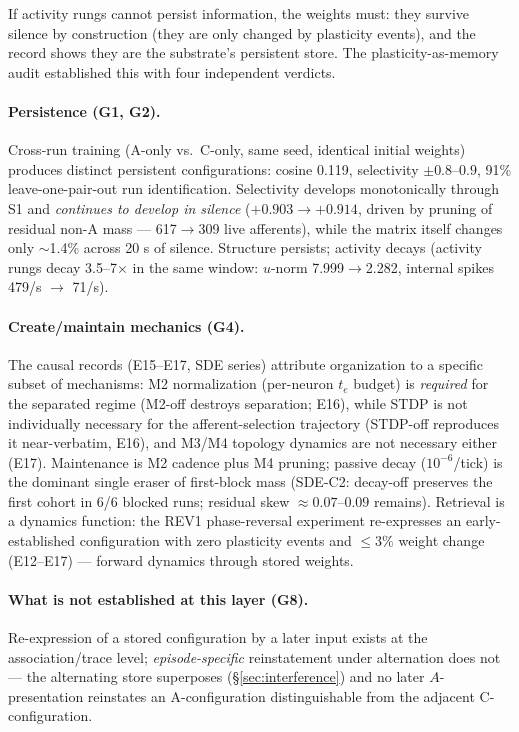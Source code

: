 If activity rungs cannot persist information, the weights must: they
survive silence by construction (they are only changed by plasticity
events), and the record shows they are the substrate's persistent store.
The plasticity-as-memory audit \cite{synmem} established this with four
independent verdicts.

\paragraph{Persistence (G1, G2).}
Cross-run training (A-only vs.\ C-only, same seed, identical initial
weights) produces distinct persistent configurations: cosine 0.119,
selectivity \(\pm 0.8\)--\(0.9\), 91\% leave-one-pair-out run
identification. Selectivity develops monotonically through S1 and
\emph{continues to develop in silence} (\(+0.903 \to +0.914\), driven by
pruning of residual non-A mass --- 617\(\to\)309 live afferents),
while the matrix itself changes only \(\sim\)1.4\% across 20 s of
silence. Structure persists; activity decays (activity rungs decay
3.5--7\(\times\) in the same window: \(u\)-norm 7.999\(\to\)2.282,
internal spikes 479/s \(\to\) 71/s).

\paragraph{Create/maintain mechanics (G4).}
The causal records (E15--E17, SDE series) attribute organization to a
specific subset of mechanisms: M2 normalization (per-neuron \(t_e\)
budget) is \emph{required} for the separated regime (M2-off destroys
separation; E16), while STDP is not individually necessary for the
afferent-selection trajectory (STDP-off reproduces it near-verbatim,
E16), and M3/M4 topology dynamics are not necessary either (E17).
Maintenance is M2 cadence plus M4 pruning; passive decay
(\(10^{-6}\)/tick) is the dominant single eraser of first-block mass
(SDE-C2: decay-off preserves the first cohort in 6/6 blocked runs;
residual skew \(\approx 0.07\)--\(0.09\) remains). Retrieval is a
dynamics function: the REV1 phase-reversal experiment re-expresses an
early-established configuration with zero plasticity events and
\(\le 3\%\) weight change (E12--E17) --- forward dynamics through
stored weights.

\paragraph{What is not established at this layer (G8).}
Re-expression of a stored configuration by a later input exists at the
association/trace level; \emph{episode-specific} reinstatement under
alternation does not --- the alternating store superposes
(§\ref{sec:interference}) and no later \(A\)-presentation reinstates an
A-configuration distinguishable from the adjacent C-configuration.

